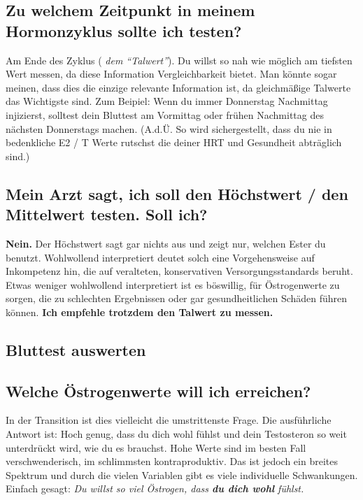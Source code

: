 \documentclass{article}
\begin{document}
\subsection{Zu welchem Zeitpunkt in meinem Hormonzyklus sollte ich testen?}

Am Ende des Zyklus (\textit{ dem “Talwert”}). Du willst so nah wie möglich am tiefsten Wert messen, da diese Information Vergleichbarkeit bietet. Man könnte sogar meinen, dass dies die einzige relevante Information ist, da gleichmäßige Talwerte das Wichtigste sind. Zum Beipiel: Wenn du immer Donnerstag Nachmittag injizierst, solltest dein Bluttest am Vormittag oder frühen Nachmittag des nächsten Donnerstags machen. (A.d.Ü. So wird sichergestellt, dass du nie in bedenkliche E2 / T Werte rutschst die deiner HRT und Gesundheit abträglich sind.)

\subsection{Mein Arzt sagt, ich soll den Höchstwert / den Mittelwert testen. Soll ich?}

\textbf{Nein.} Der Höchstwert sagt gar nichts aus und zeigt nur, welchen Ester du benutzt. Wohlwollend interpretiert deutet solch eine Vorgehensweise auf Inkompetenz hin, die auf veralteten, konservativen Versorgungsstandards beruht. Etwas weniger wohlwollend interpretiert ist es böswillig, für Östrogenwerte zu sorgen, die zu schlechten Ergebnissen oder gar gesundheitlichen Schäden führen können. \textbf{Ich empfehle trotzdem den Talwert zu messen.}

\subsection*{Bluttest auswerten}

\subsection{Welche Östrogenwerte will ich erreichen?}

In der Transition ist dies vielleicht die umstrittenste Frage. Die ausführliche Antwort ist: Hoch genug, dass du dich wohl fühlst und dein Testosteron so weit unterdrückt wird, wie du es brauchst. Hohe Werte sind im besten Fall verschwenderisch, im schlimmsten kontraproduktiv. Das ist jedoch ein breites Spektrum und durch die vielen Variablen gibt es viele individuelle Schwankungen. Einfach gesagt: \textit{Du willst so viel Östrogen, dass \textbf{du dich wohl} fühlst.}
\end{document}
